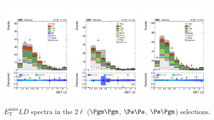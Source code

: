\begin{figure}[htb]
	\centering 
\includegraphics[width=0.32\textwidth]{plots_leptons/lep_evtsel/2lss_SR/mm/metLD.pdf}
\includegraphics[width=0.32\textwidth]{plots_leptons/lep_evtsel/2lss_SR/ee/metLD.pdf}
\includegraphics[width=0.32\textwidth]{plots_leptons/lep_evtsel/2lss_SR/em/metLD.pdf}
	\caption{$E_\mathrm{T}^\mathrm{miss}LD$ spectra in the 2$\ell$ ($\Pgm\Pgm$, $\Pe\Pe$, $\Pe\Pgm$) selections.}
	\label{fig:2l_metLD}
\end{figure}




